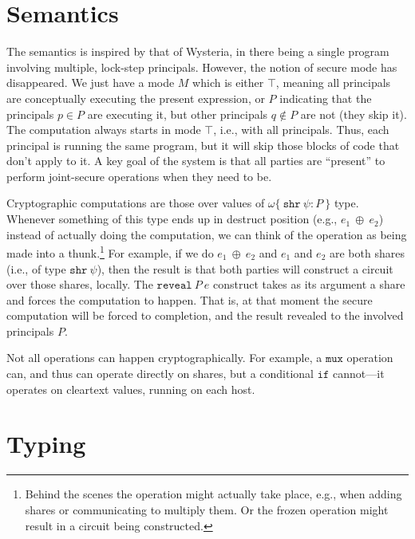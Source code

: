 \documentclass[10pt]{article}
\newcommand{\kw}[1]{\ensuremath{\mathtt{#1}}}
\newcommand{\sshare}[1]{\ensuremath{\mathtt{shr}~{#1}}}
\newcommand{\sectyp}[3]{\ensuremath{{#1} \{~{#2}:{#3}~\}}}
\newcommand{\ebinop}[2]{\ensuremath{{#1}~\oplus~{#2}}}
\newcommand{\ereveal}[2]{\ensuremath{\kw{reveal}~{#1}~{#2}}}
\begin{document}
\section{Semantics}

The semantics is inspired by that of Wysteria, in there being a single
program involving multiple, lock-step principals. However, the notion
of secure mode has disappeared. We just have a mode $M$ which is
either $\top$, meaning all principals are conceptually executing the
present expression, or ${P}$ indicating that the principals
$p \in P$ are executing it, but other principals $q \not\in P$ are not
(they skip it). The computation always starts in mode $\top$, i.e.,
with all principals. Thus, each principal is running the same program,
but it will skip those blocks of code that don't apply to it.  A key
goal of the system is that all parties are ``present'' to perform
joint-secure operations when they need to be.

Cryptographic computations are those over values of
$\sectyp{\omega}{\sshare{\psi}}{P}$ type. Whenever something of this
type ends up in destruct position (e.g., $\ebinop{e_1}{e_2}$) instead
of actually doing the computation, we can think of the operation as
being made into a thunk.\footnote{Behind the scenes the operation
  might actually take place, e.g., when adding shares or communicating
  to multiply them. Or the frozen operation might result in a circuit
  being constructed.} For example, if we do $\ebinop{e_1}{e_2}$ and
$e_1$ and $e_2$ are both shares (i.e., of type $\sshare{\psi}$), then
the result is that both parties will construct a circuit over those
shares, locally. The $\ereveal{P}{e}$ construct takes as its argument
a share and forces the computation to happen. That is, at that moment
the secure computation will be forced to completion, and the result
revealed to the involved principals $P$.

Not all operations can happen cryptographically. For example, a
$\kw{mux}$ operation can, and thus can operate directly on shares, but
a conditional $\kw{if}$ cannot---it operates on cleartext values,
running on each host.

\section{Typing}
\end{document}
